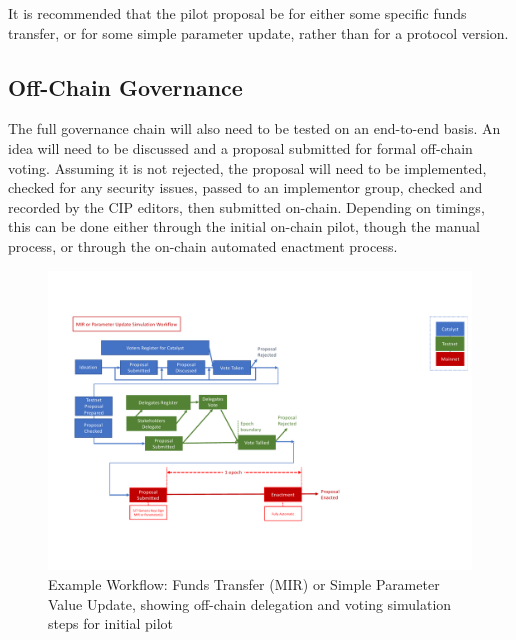 It is recommended that the pilot proposal be for either some specific funds transfer, or for some simple parameter update, rather than for a protocol version.

\subsection{Off-Chain Governance}

The full governance chain will also need to be tested on an end-to-end basis.  An idea will need to be discussed and a proposal submitted for formal off-chain voting.  Assuming it is not rejected,
the proposal will need to be implemented, checked for any security issues, passed to an implementor group, checked and recorded by the CIP editors, then submitted on-chain.
Depending on timings, this can be done either through the initial on-chain pilot, though the manual process, or through the on-chain automated enactment process.

\begin{figure}
  \includegraphics[trim=0 90 0 80,clip,width=\textwidth]{Workflow3}
  \caption{Example Workflow: Funds Transfer (MIR) or Simple Parameter Value Update, showing off-chain delegation and voting simulation steps for initial pilot}
  \label{fig:workflow-mir2}
\end{figure}

